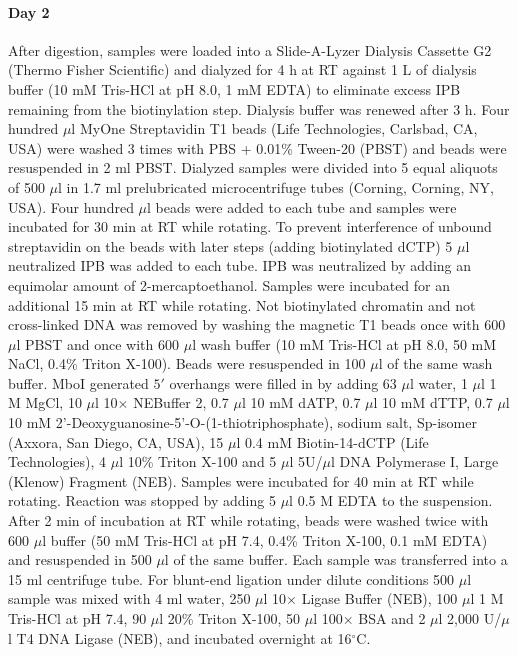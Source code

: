 \paragraph{Day 2}
After digestion, samples were loaded into a Slide-A-Lyzer Dialysis
Cassette G2 (Thermo Fisher Scientific) and dialyzed for 4 h at RT
against 1 L of dialysis buffer (10 mM Tris-HCl at pH 8.0, 1 mM EDTA)
to eliminate excess IPB remaining from the biotinylation
step. Dialysis buffer was renewed after 3 h. Four hundred $\mu$l MyOne
Streptavidin T1 beads (Life Technologies, Carlsbad, CA, USA) were
washed 3 times with PBS + 0.01\% Tween-20 (PBST) and beads were
resuspended in 2 ml PBST. Dialyzed samples were divided into 5 equal
aliquots of 500 $\mu$l in 1.7 ml prelubricated microcentrifuge tubes
(Corning, Corning, NY, USA). Four hundred $\mu$l beads were added to each
tube and samples were incubated for 30 min at RT while rotating. To
prevent interference of unbound streptavidin on the beads with later
steps (adding biotinylated dCTP) 5 $\mu$l neutralized IPB was added to
each tube. IPB was neutralized by adding an equimolar amount of
2-mercaptoethanol. Samples were incubated for an additional 15 min at
RT while rotating. Not biotinylated chromatin and not cross-linked DNA
was removed by washing the magnetic T1 beads once with 600 $\mu$l PBST and
once with 600 $\mu$l wash buffer (10 mM Tris-HCl at pH 8.0, 50 mM NaCl,
0.4\% Triton X-100). Beads were resuspended in 100 $\mu$l of the same wash
buffer. MboI generated $5'$ overhangs were filled in by adding 63 $\mu$l
water, 1 $\mu$l 1 M MgCl, 10 $\mu$l 10$\times$ NEBuffer 2, 0.7 $\mu$l 10 mM dATP, 0.7 $\mu$l
10 mM dTTP, 0.7 $\mu$l 10 mM 2'-Deoxyguanosine-5'-O-(1-thiotriphosphate),
sodium salt, Sp-isomer (Axxora, San Diego, CA, USA), 15 $\mu$l 0.4 mM
Biotin-14-dCTP (Life Technologies), 4 $\mu$l 10\% Triton X-100 and 5 $\mu$l
5U/$\mu$l DNA Polymerase I, Large (Klenow) Fragment (NEB). Samples were
incubated for 40 min at RT while rotating. Reaction was stopped by
adding 5 $\mu$l 0.5 M EDTA to the suspension. After 2 min of incubation at
RT while rotating, beads were washed twice with 600 $\mu$l buffer (50 mM
Tris-HCl at pH 7.4, 0.4\% Triton X-100, 0.1 mM EDTA) and resuspended
in 500 $\mu$l of the same buffer. Each sample was transferred into a 15 ml
centrifuge tube. For blunt-end ligation under dilute conditions 500 $\mu$l
sample was mixed with 4 ml water, 250 $\mu$l 10$\times$ Ligase Buffer (NEB), 100
$\mu$l 1 M Tris-HCl at pH 7.4, 90 $\mu$l 20\% Triton X-100, 50 $\mu$l 100$\times$ BSA and
2 $\mu$l 2,000 U/$\mu$l T4 DNA Ligase (NEB), and incubated overnight at 16$^\circ$C.

